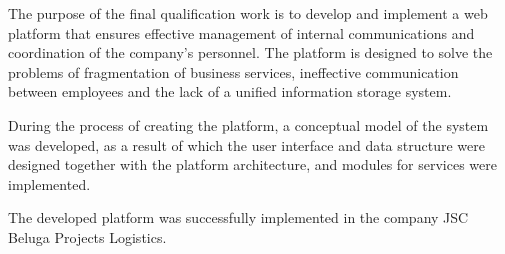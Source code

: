 The purpose of the final qualification work is to develop and implement a web platform that ensures effective management of internal communications and coordination of the company's personnel. The platform is designed to solve the problems of fragmentation of business services, ineffective communication between employees and the lack of a unified information storage system.

During the process of creating the platform, a conceptual model of the system was developed, as a result of which the user interface and data structure were designed together with the platform architecture, and modules for services were implemented.

The developed platform was successfully implemented in the company JSC Beluga Projects Logistics.
